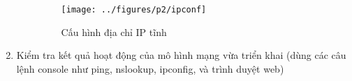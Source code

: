 \begin{enumerate}
\begin{enumerate}
\begin{figure}[H]
\begin{center}
\texttt{[image: ../figures/p2/ipconf]}
\end{center}
\caption{Cấu hình địa chỉ IP tĩnh}
\end{figure}

\end{enumerate}
\bf \item Kiểm tra kết quả hoạt động của mô hình mạng vừa triển khai (dùng các câu lệnh console như ping, nslookup, ipconfig, và trình duyệt web)

\rm

\end{enumerate}








